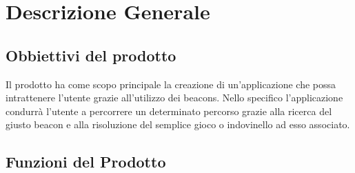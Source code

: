 \section{Descrizione Generale}
\label{sec:DescrizioneGenerale}

\subsection{Obbiettivi del prodotto}
\label{sec:ObbiettiviDelProdotto}
Il prodotto ha come scopo principale la creazione di un'applicazione che possa intrattenere l'utente grazie all'utilizzo dei beacons. Nello specifico l'applicazione condurrà l'utente a percorrere un determinato percorso grazie alla ricerca del giusto beacon e alla risoluzione del semplice gioco o indovinello ad esso associato.

\subsection{Funzioni del Prodotto}

